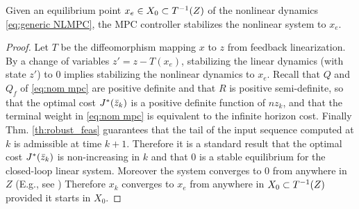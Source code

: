 
\begin{theorem}[Stability]
	\label{thm:stability}
Given an equilibrium point $x_e \in X_0 \subset T^{-1}(Z)$ of the nonlinear dynamics \eqref{eq:generic NLMPC}, the MPC controller stabilizes the nonlinear system to $x_e$.
\end{theorem}

\begin{proof}
Let $T$ be the diffeomorphism mapping $x$ to $z$ from feedback linearization.
By a change of variables $z' = z - T(x_e)$, stabilizing the linear dynamics (with state $z'$) to 0 implies stabilizing the nonlinear dynamics to $x_e$.
Recall that $Q$ and $Q_f$ of  \eqref{eq:nom mpc} are positive definite and that $R$ is positive semi-definite,  so that the optimal cost $J^*(\bar{z}_{k})$ is a positive definite function of $nz_{k}$, and that the terminal weight in \eqref{eq:nom mpc} is equivalent to the infinite horizon cost. 
Finally Thm.  \ref{th:robust_feas} guarantees that the tail of the input sequence computed at $k$ is admissible at time $k+1$. 
Therefore it is a standard result that the optimal cost $J^{*}(\bar{z}_{k})$ is non-increasing in $k$ and that $0$ is a stable equilibrium for the closed-loop linear system. 
Moreover the system converges to 0 from anywhere in $Z$ (E.g., see \cite{CannonK15MPC} )
Therefore $x_k$ converges to $x_e$ from anywhere in $X_0 \subset T^{-1}(Z)$ provided it starts in $X_0$.
\end{proof}